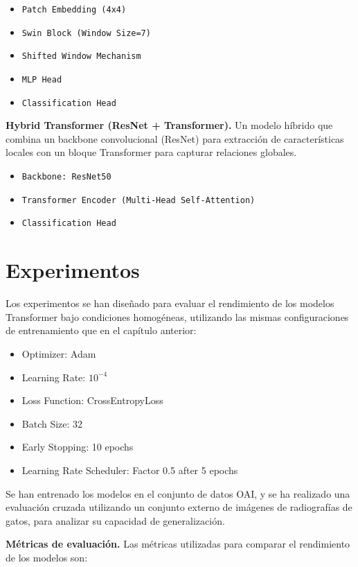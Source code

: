 \documentclass[11pt,spanish,listoffigures,listoftables]{tfgetsinf}
\begin{document}
\begin{itemize}
\item 	\texttt{Patch Embedding (4x4)}
\item 	\texttt{Swin Block (Window Size=7)}
\item 	\texttt{Shifted Window Mechanism}
\item 	\texttt{MLP Head}
\item 	\texttt{Classification Head}
\end{itemize}

\textbf{Hybrid Transformer (ResNet + Transformer).}
Un modelo híbrido que combina un backbone convolucional (ResNet) para extracción de características locales con un bloque Transformer para capturar relaciones globales.

\begin{itemize}
\item 	\texttt{Backbone: ResNet50}
\item 	\texttt{Transformer Encoder (Multi-Head Self-Attention)}
\item 	\texttt{Classification Head}
\end{itemize}

\section{Experimentos}
Los experimentos se han diseñado para evaluar el rendimiento de los modelos Transformer bajo condiciones homogéneas, utilizando las mismas configuraciones de entrenamiento que en el capítulo anterior:

\begin{itemize}
\item Optimizer: Adam
\item Learning Rate: $10^{-4}$
\item Loss Function: CrossEntropyLoss
\item Batch Size: 32
\item Early Stopping: 10 epochs
\item Learning Rate Scheduler: Factor 0.5 after 5 epochs
\end{itemize}

Se han entrenado los modelos en el conjunto de datos OAI, y se ha realizado una evaluación cruzada utilizando un conjunto externo de imágenes de radiografías de gatos, 
para analizar su capacidad de generalización.

\textbf{Métricas de evaluación.}
Las métricas utilizadas para comparar el rendimiento de los modelos son:
\end{document}
